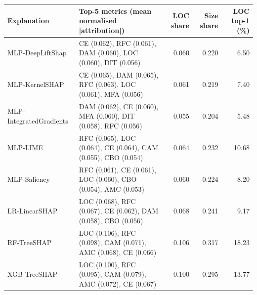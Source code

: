 \small
\begin{tabular}{lp{7.2cm}rrr}
\toprule
Explanation & Top-5 metrics (mean normalised |attribution|) & LOC share & Size share & LOC top-1 (\%) \\
\midrule
MLP-DeepLiftShap & CE (0.062), RFC (0.061), DAM (0.060), LOC (0.060), DIT (0.056) & 0.060 & 0.220 & 6.50 \\
MLP-KernelSHAP & CE (0.065), DAM (0.065), RFC (0.063), LOC (0.061), MFA (0.056) & 0.061 & 0.219 & 7.40 \\
MLP-IntegratedGradients & DAM (0.062), CE (0.060), MFA (0.060), DIT (0.058), RFC (0.056) & 0.055 & 0.204 & 5.48 \\
MLP-LIME & RFC (0.065), LOC (0.064), CE (0.064), CAM (0.055), CBO (0.054) & 0.064 & 0.232 & 10.68 \\
MLP-Saliency & RFC (0.061), CE (0.061), LOC (0.060), CBO (0.054), AMC (0.053) & 0.060 & 0.224 & 8.20 \\
LR-LinearSHAP & LOC (0.068), RFC (0.067), CE (0.062), DAM (0.058), CBO (0.056) & 0.068 & 0.241 & 9.17 \\
RF-TreeSHAP & LOC (0.106), RFC (0.098), CAM (0.071), AMC (0.068), CE (0.066) & 0.106 & 0.317 & 18.23 \\
XGB-TreeSHAP & LOC (0.100), RFC (0.095), CAM (0.079), AMC (0.072), CE (0.067) & 0.100 & 0.295 & 13.77 \\
\bottomrule
\end{tabular}
